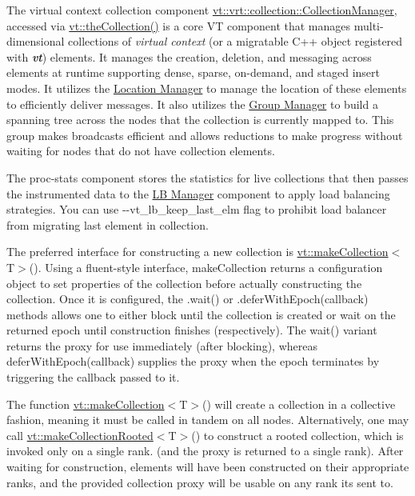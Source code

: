 The virtual context collection component {\ttfamily \hyperlink{structvt_1_1vrt_1_1collection_1_1_collection_manager}{vt\+::vrt\+::collection\+::\+Collection\+Manager}}, accessed via {\ttfamily \hyperlink{namespacevt_a1c45ce63bfd2c327ff7d76a319a371d8}{vt\+::the\+Collection()}} is a core VT component that manages multi-\/dimensional collections of {\itshape virtual context} (or a migratable C++ object registered with {\bfseries {\itshape vt}}) elements. It manages the creation, deletion, and messaging across elements at runtime supporting dense, sparse, on-\/demand, and staged insert modes. It utilizes the \hyperlink{location}{Location Manager} to manage the location of these elements to efficiently deliver messages. It also utilizes the \hyperlink{group}{Group Manager} to build a spanning tree across the nodes that the collection is currently mapped to. This group makes broadcasts efficient and allows reductions to make progress without waiting for nodes that do not have collection elements.

The proc-\/stats component stores the statistics for live collections that then passes the instrumented data to the \hyperlink{lb-manager}{LB Manager} component to apply load balancing strategies. You can use {\ttfamily -\/-\/vt\+\_\+lb\+\_\+keep\+\_\+last\+\_\+elm} flag to prohibit load balancer from migrating last element in collection.

The preferred interface for constructing a new collection is {\ttfamily \hyperlink{namespacevt_a95c0d739e465e5324c2383f43ab2a145}{vt\+::make\+Collection}$<$T$>$()}. Using a fluent-\/style interface, {\ttfamily make\+Collection} returns a configuration object to set properties of the collection before actually constructing the collection. Once it is configured, the {\ttfamily .wait()} or {\ttfamily .defer\+With\+Epoch(callback)} methods allows one to either block until the collection is created or wait on the returned epoch until construction finishes (respectively). The {\ttfamily wait()} variant returns the proxy for use immediately (after blocking), whereas {\ttfamily defer\+With\+Epoch(callback)} supplies the proxy when the epoch terminates by triggering the callback passed to it.

The function {\ttfamily \hyperlink{namespacevt_a95c0d739e465e5324c2383f43ab2a145}{vt\+::make\+Collection}$<$T$>$()} will create a collection in a collective fashion, meaning it must be called in tandem on all nodes. Alternatively, one may call {\ttfamily \hyperlink{namespacevt_a37806a29a810adceb5792f7cfd4de106}{vt\+::make\+Collection\+Rooted}$<$T$>$()} to construct a rooted collection, which is invoked only on a single rank. (and the proxy is returned to a single rank). After waiting for construction, elements will have been constructed on their appropriate ranks, and the provided collection proxy will be usable on any rank it\textquotesingle{}s sent to.

